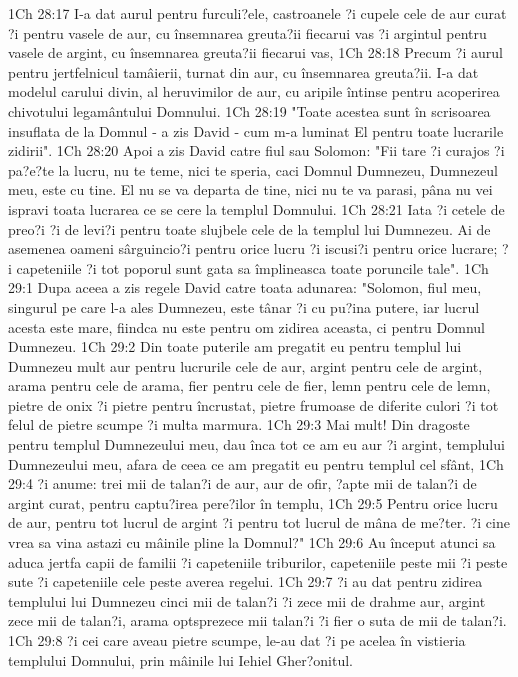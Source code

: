 1Ch 28:17  I-a dat aurul pentru furculi?ele, castroanele ?i cupele cele de aur curat ?i pentru vasele de aur, cu însemnarea greuta?ii fiecarui vas ?i argintul pentru vasele de argint, cu însemnarea greuta?ii fiecarui vas,
1Ch 28:18  Precum ?i aurul pentru jertfelnicul tamâierii, turnat din aur, cu însemnarea greuta?ii. I-a dat modelul carului divin, al heruvimilor de aur, cu aripile întinse pentru acoperirea chivotului legamântului Domnului.
1Ch 28:19  "Toate acestea sunt în scrisoarea insuflata de la Domnul - a zis David - cum m-a luminat El pentru toate lucrarile zidirii".
1Ch 28:20  Apoi a zis David catre fiul sau Solomon: "Fii tare ?i curajos ?i pa?e?te la lucru, nu te teme, nici te speria, caci Domnul Dumnezeu, Dumnezeul meu, este cu tine. El nu se va departa de tine, nici nu te va parasi, pâna nu vei ispravi toata lucrarea ce se cere la templul Domnului.
1Ch 28:21  Iata ?i cetele de preo?i ?i de levi?i pentru toate slujbele cele de la templul lui Dumnezeu. Ai de asemenea oameni sârguincio?i pentru orice lucru ?i iscusi?i pentru orice lucrare; ?i capeteniile ?i tot poporul sunt gata sa împlineasca toate poruncile tale".
1Ch 29:1  Dupa aceea a zis regele David catre toata adunarea: "Solomon, fiul meu, singurul pe care l-a ales Dumnezeu, este tânar ?i cu pu?ina putere, iar lucrul acesta este mare, fiindca nu este pentru om zidirea aceasta, ci pentru Domnul Dumnezeu.
1Ch 29:2  Din toate puterile am pregatit eu pentru templul lui Dumnezeu mult aur pentru lucrurile cele de aur, argint pentru cele de argint, arama pentru cele de arama, fier pentru cele de fier, lemn pentru cele de lemn, pietre de onix ?i pietre pentru încrustat, pietre frumoase de diferite culori ?i tot felul de pietre scumpe ?i multa marmura.
1Ch 29:3  Mai mult! Din dragoste pentru templul Dumnezeului meu, dau înca tot ce am eu aur ?i argint, templului Dumnezeului meu, afara de ceea ce am pregatit eu pentru templul cel sfânt,
1Ch 29:4  ?i anume: trei mii de talan?i de aur, aur de ofir, ?apte mii de talan?i de argint curat, pentru captu?irea pere?ilor în templu,
1Ch 29:5  Pentru orice lucru de aur, pentru tot lucrul de argint ?i pentru tot lucrul de mâna de me?ter. ?i cine vrea sa vina astazi cu mâinile pline la Domnul?"
1Ch 29:6  Au început atunci sa aduca jertfa capii de familii ?i capeteniile triburilor, capeteniile peste mii ?i peste sute ?i capeteniile cele peste averea regelui.
1Ch 29:7  ?i au dat pentru zidirea templului lui Dumnezeu cinci mii de talan?i ?i zece mii de drahme aur, argint zece mii de talan?i, arama optsprezece mii talan?i ?i fier o suta de mii de talan?i.
1Ch 29:8  ?i cei care aveau pietre scumpe, le-au dat ?i pe acelea în vistieria templului Domnului, prin mâinile lui Iehiel Gher?onitul.
